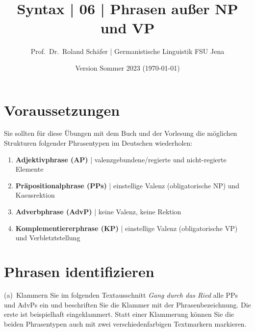 \documentclass[12pt,a4paper,twoside]{article}
\author{Prof.\ Dr.\ Roland Schäfer | Germanistische Linguistik FSU Jena}
\title{Syntax | 06 | Phrasen außer NP und VP}
\date{Version Sommer 2023 (\today)}
\newcommand{\Lf}{
  \setlength{\itemsep}{1pt}
  \setlength{\parskip}{0pt}
  \setlength{\parsep}{0pt}
}
\begin{document}
\maketitle

\section*{Voraussetzungen}

Sie sollten für diese Übungen mit dem Buch und der Vorlesung die möglichen Strukturen folgender Phrasentypen im Deutschen wiederholen:

\begin{enumerate}\Lf
  \item \textbf{Adjektivphrase (AP)} | valenzgebundene\slash regierte und nicht-regierte Elemente
  \item \textbf{Präpositionalphrase (PPs)} | einstellige Valenz (obligatorische NP) und Kasusrektion
  \item \textbf{Adverbphrase (AdvP)} | keine Valenz, keine Rektion
  \item \textbf{Komplementiererphrase (KP)} | einstellige Valenz (obligatorische VP) und Verbletztstellung
\end{enumerate}

\section{Phrasen identifizieren}\label{sec:erkennen}

(a)~Klammern Sie im folgenden Textausschnitt \textit{Gang durch das Ried} alle PPs und AdvPs ein und beschriften Sie die Klammer mit der Phrasenbezeichnung.
Die erste ist beispielhaft eingeklammert.
Statt einer Klammerung können Sie die beiden Phrasentypen auch mit zwei verschiedenfarbigen Textmarkern markieren.
\end{document}
